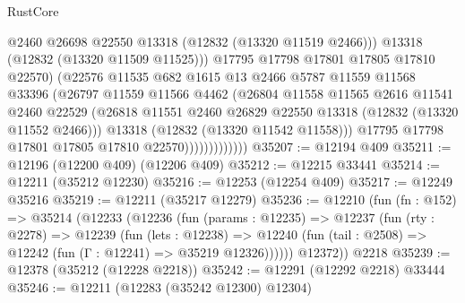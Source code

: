 \begin{lexlean}{RustCore}
\begin{coremodule}
                                @2460
                                @26698
                                @22550
                                @13318
                                (@12832 (@13320 @11519 @2466)))
                              @13318
                              (@12832 (@13320 @11509 @11525)))
                            @17795
                            @17798
                            @17801
                            @17805
                            @17810
                            @22570)
                          (@22576
                            @11535
                            @682
                            @1615
                            @13
                            @2466
                            @5787
                            @11559
                            @11568
                            @33396
                            (@26797
                              @11559
                              @11566
                              @4462
                              (@26804
                                @11558
                                @11565
                                @2616
                                @11541
                                @2460
                                @22529
                                (@26818
                                  @11551
                                  @2460
                                  @26829
                                  @22550
                                  @13318
                                  (@12832 (@13320 @11552 @2466)))
                                @13318
                                (@12832 (@13320 @11542 @11558)))
                              @17795
                              @17798
                              @17801
                              @17805
                              @17810
                              @22570)))))))))))))
@35207 := @12194 @409
@35211 := @12196 (@12200 @409) (@12206 @409)
@35212 := @12215 @33441
@35214 := @12211 (@35212 @12230)
@35216 := @12253 (@12254 @409)
@35217 := @12249 @35216
@35219 := @12211 (@35217 @12279)
@35236 := @12210
    (fun (fn : @152) =>
    @35214
      (@12233
        (@12236
          (fun (params : @12235) =>
          @12237
            (fun (rty : @2278) =>
            @12239
              (fun (lets : @12238) =>
              @12240 (fun (tail : @2508) => @12242 (fun (Γ : @12241) => @35219 @12326))))))
        @12372))
    @2218
@35239 := @12378 (@35212 (@12228 @2218))
@35242 := @12291 (@12292 @2218) @33444
@35246 := @12211 (@12283 (@35242 @12300) @12304)

\end{coremodule}
\end{lexlean}
